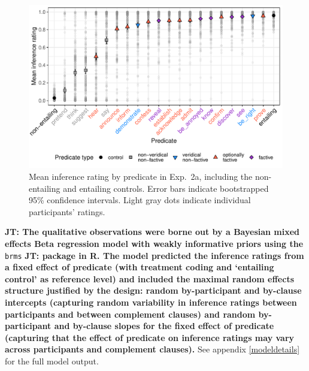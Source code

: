 \documentclass[11pt,fleqn]{article}
\newcommand{\6}{\mbox{$[\hspace*{-.6mm}[$}}
\newcommand{\9}{\mbox{$]\hspace*{-.6mm}]$}}
\newcommand{\jt}[1]{\textbf{\color{blue}JT: #1}}
\begin{document}
\begin{figure}[h!]
\centering

\includegraphics[width=.7\paperwidth]{../../results/4-veridicality3/graphs/means-inference-by-predicate-variability}

\caption{Mean inference rating by predicate in Exp.~2a, including the non-entailing and entailing controls. Error bars indicate bootstrapped 95\% confidence intervals. Light gray dots indicate individual participants' ratings.} 
\label{f-veridicality-predicate}
\end{figure}

\jt{The qualitative observations were borne out by a Bayesian mixed effects Beta regression model with weakly informative priors using the} \verb|brms| \jt{package in R. The model predicted the inference ratings from a fixed effect of predicate (with treatment coding and `entailing control' as  reference level) and included the maximal random effects structure justified by the design: random by-participant and by-clause intercepts (capturing random variability in inference ratings between participants and between complement clauses) and random by-participant and by-clause slopes for the fixed effect of predicate (capturing that the effect of predicate on inference ratings may vary across participants and complement clauses).} See appendix \ref{modeldetails} for the full model output.
\end{document}
